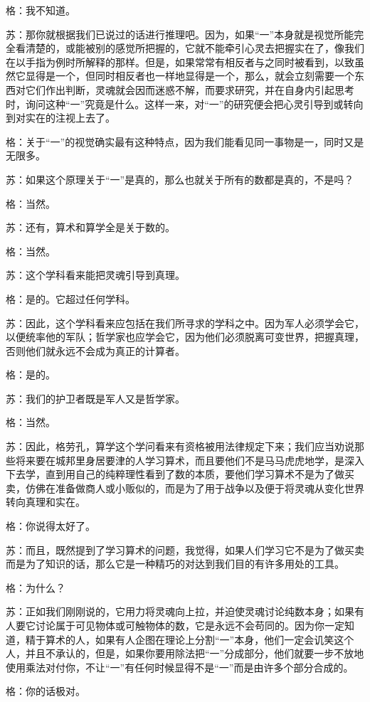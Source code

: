 \documentclass[12pt,oneside]{book}
\begin{document}
格：我不知道。

苏：那你就根据我们已说过的话进行推理吧。因为，如果“一”本身就是视觉所能完全看清楚的，或能被别的感觉所把握的，它就不能牵引心灵去把握实在了，像我们在以手指为例时所解释的那样。但是，如果常常有相反者与之同时被看到，以致虽然它显得是一个，但同时相反者也一样地显得是一个，那么，就会立刻需要一个东西对它们作出判断，灵魂就会因而迷惑不解，而要求研究，并在自身内引起思考时，询问这种“一”究竟是什么。这样一来，对“一”的研究便会把心灵引导到或转向到对实在的注视上去了。

格：关于“一”的视觉确实最有这种特点，因为我们能看见同一事物是一，同时又是无限多。

苏：如果这个原理关于“一”是真的，那么也就关于所有的数都是真的，不是吗？

格：当然。

苏：还有，算术和算学全是关于数的。

格：当然。

苏：这个学科看来能把灵魂引导到真理。

格：是的。它超过任何学科。

苏：因此，这个学科看来应包括在我们所寻求的学科之中。因为军人必须学会它，以便统率他的军队；哲学家也应学会它，因为他们必须脱离可变世界，把握真理，否则他们就永远不会成为真正的计算者。

格：是的。

苏：我们的护卫者既是军人又是哲学家。

格：当然。

苏：因此，格劳孔，算学这个学问看来有资格被用法律规定下来；我们应当劝说那些将来要在城邦里身居要津的人学习算术，而且要他们不是马马虎虎地学，是深入下去学，直到用自己的纯粹理性看到了数的本质，要他们学习算术不是为了做买卖，仿佛在准备做商人或小贩似的，而是为了用于战争以及便于将灵魂从变化世界转向真理和实在。

格：你说得太好了。

苏：而且，既然提到了学习算术的问题，我觉得，如果人们学习它不是为了做买卖而是为了知识的话，那么它是一种精巧的对达到我们目的有许多用处的工具。

格：为什么？

苏：正如我们刚刚说的，它用力将灵魂向上拉，并迫使灵魂讨论纯数本身；如果有人要它讨论属于可见物体或可触物体的数，它是永远不会苟同的。因为你一定知道，精于算术的人，如果有人企图在理论上分割“一”本身，他们一定会讥笑这个人，并且不承认的，但是，如果你要用除法把“一”分成部分，他们就要一步不放地使用乘法对付你，不让“一”有任何时候显得不是“一”而是由许多个部分合成的。

格：你的话极对。
\end{document}
